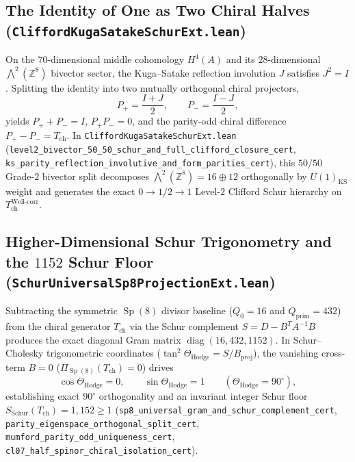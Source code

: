 \documentclass[11pt,a4paper]{article}
\begin{document}
\subsection{The Identity of One as Two Chiral Halves (\texttt{Clifford\allowbreak{}Kuga\allowbreak{}Satake\allowbreak{}Schur\allowbreak{}Ext.lean})}
On the $70$-dimensional middle cohomology $H^4(A)$ and its $28$-dimensional $\bigwedge^2(\mathbb{Z}^8)$ bivector sector, the Kuga--Satake reflection involution $J$ satisfies $J^2 = I$. Splitting the identity into two mutually orthogonal chiral projectors,
\[
  P_+ = \frac{I + J}{2}, \qquad P_- = \frac{I - J}{2},
\]
yields $P_+ + P_- = I$, $P_+ P_- = 0$, and the parity-odd chiral difference $P_+ - P_- = T_{\mathrm{ch}}$. In \texttt{Clifford\allowbreak{}Kuga\allowbreak{}Satake\allowbreak{}Schur\allowbreak{}Ext.lean} (\texttt{level2\_\allowbreak{}bivector\_\allowbreak{}50\_\allowbreak{}50\_\allowbreak{}schur\_\allowbreak{}and\_\allowbreak{}full\_\allowbreak{}clifford\_\allowbreak{}closure\_\allowbreak{}cert}, \texttt{ks\_\allowbreak{}parity\_\allowbreak{}reflection\_\allowbreak{}involutive\_\allowbreak{}and\_\allowbreak{}form\_\allowbreak{}parities\_\allowbreak{}cert}), this $50/50$ Grade-$2$ bivector split decomposes $\bigwedge^2(\mathbb{Z}^8) = 16 \oplus 12$ orthogonally by $U(1)_{\mathrm{KS}}$ weight and generates the exact $0 \to 1/2 \to 1$ Level-$2$ Clifford Schur hierarchy on $T_{\mathrm{ch}}^{\mathrm{Weil\text{-}corr}}$.

\subsection{Higher-Dimensional Schur Trigonometry and the $1152$ Schur Floor (\texttt{Schur\allowbreak{}Universal\allowbreak{}Sp8\allowbreak{}Projection\allowbreak{}Ext.lean})}
Subtracting the symmetric $\operatorname{Sp}(8)$ divisor baseline ($Q_0 = 16$ and $Q_{\mathrm{prim}} = 432$) from the chiral generator $T_{\mathrm{ch}}$ via the Schur complement $S = D - B^T A^{-1} B$ produces the exact diagonal Gram matrix $\operatorname{diag}(16, 432, 1152)$. In Schur--Cholesky trigonometric coordinates ($\tan^2\Theta_{\mathrm{Hodge}} = S / B_{\mathrm{proj}}$), the vanishing cross-term $B = 0$ ($\Pi_{\operatorname{Sp}(8)}(T_{\mathrm{ch}}) = 0$) drives
\[
  \cos\Theta_{\mathrm{Hodge}} = 0, \qquad \sin\Theta_{\mathrm{Hodge}} = 1 \qquad (\Theta_{\mathrm{Hodge}} = 90^\circ),
\]
establishing exact $90^\circ$ orthogonality and an invariant integer Schur floor $S_{\mathrm{Schur}}(T_{\mathrm{ch}}) = 1{,}152 \ge 1$ (\texttt{sp8\_\allowbreak{}universal\_\allowbreak{}gram\_\allowbreak{}and\_\allowbreak{}schur\_\allowbreak{}complement\_\allowbreak{}cert}, \texttt{parity\_\allowbreak{}eigenspace\_\allowbreak{}orthogonal\_\allowbreak{}split\_\allowbreak{}cert}, \texttt{mumford\_\allowbreak{}parity\_\allowbreak{}odd\_\allowbreak{}uniqueness\_\allowbreak{}cert}, \texttt{cl07\_\allowbreak{}half\_\allowbreak{}spinor\_\allowbreak{}chiral\_\allowbreak{}isolation\_\allowbreak{}cert}).
\end{document}
